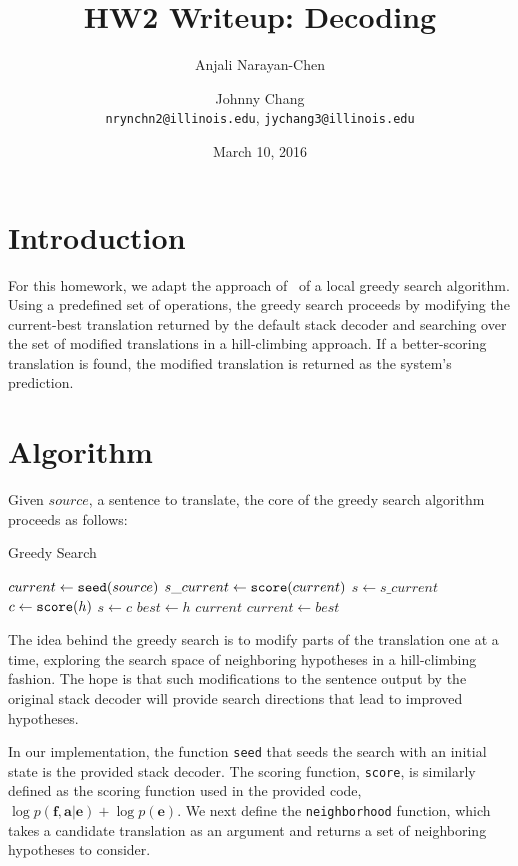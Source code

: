\documentclass[11pt,letterpaper]{article}
\title{HW2 Writeup: Decoding}
\author{Anjali Narayan-Chen \and Johnny Chang\\
{\tt nrynchn2@illinois.edu}, {\tt jychang3@illinois.edu}}
\date{March 10, 2016}
\begin{document}
\nocite{*}
\maketitle

\section{Introduction}

For this homework, we adapt the approach of~\cite{langlais2007greedy} of a local 
greedy search algorithm. Using a predefined set of operations, the greedy search 
proceeds by modifying the current-best translation returned by the default stack decoder
and searching over the set of modified translations in a hill-climbing approach. If
a better-scoring translation is found, the modified translation is returned as the system's
prediction.

\section{Algorithm}
Given $source$, a sentence to translate, the core of the greedy search algorithm proceeds as follows:
\begin{algorithm}
\caption{Greedy Search}
    \begin{algorithmic}[1]
    \State $current \leftarrow {\tt seed}(source)$
    \Loop
        \State $s\_current \leftarrow {\tt score}(current)$
        \State $s \leftarrow s\_current$
            \State $c \leftarrow {\tt score}(h)$
                \State $s \leftarrow c$
                \State $best \leftarrow h$
            \EndIf
        \EndFor
            \Return $current$
        \Else
            \State $current \leftarrow best$
        \EndIf
    \EndLoop
    \end{algorithmic}
\end{algorithm}

The idea behind the greedy search is to modify parts of the translation one at a time, exploring
the search space of neighboring hypotheses in a hill-climbing fashion. The hope is that such
modifications to the sentence output by the original stack decoder will provide search directions
that lead to improved hypotheses.

In our implementation, the function {\tt seed} that seeds the search with an initial state
is the provided stack decoder. The scoring function, {\tt score}, is similarly defined as the
scoring function used in the provided code, $\log p(\mathbf{f,a|e})+\log p(\mathbf{e})$. We next
define the {\tt neighborhood} function, which takes a candidate translation as an argument and 
returns a set of neighboring hypotheses to consider. 
\end{document}
